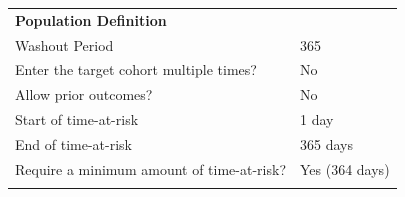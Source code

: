 \documentclass[
]{article}
\begin{document}
\begin{longtable}[]{@{}ll@{}}
\begin{minipage}[t]{0.42\columnwidth}\raggedright
\textbf{Population Definition}\strut
\end{minipage} & \begin{minipage}[t]{0.52\columnwidth}\raggedright
\strut
\end{minipage}\tabularnewline
\begin{minipage}[t]{0.42\columnwidth}\raggedright
Washout Period\strut
\end{minipage} & \begin{minipage}[t]{0.52\columnwidth}\raggedright
365\strut
\end{minipage}\tabularnewline
\begin{minipage}[t]{0.42\columnwidth}\raggedright
Enter the target cohort multiple times?\strut
\end{minipage} & \begin{minipage}[t]{0.52\columnwidth}\raggedright
No\strut
\end{minipage}\tabularnewline
\begin{minipage}[t]{0.42\columnwidth}\raggedright
Allow prior outcomes?\strut
\end{minipage} & \begin{minipage}[t]{0.52\columnwidth}\raggedright
No\strut
\end{minipage}\tabularnewline
\begin{minipage}[t]{0.42\columnwidth}\raggedright
Start of time-at-risk\strut
\end{minipage} & \begin{minipage}[t]{0.52\columnwidth}\raggedright
1 day\strut
\end{minipage}\tabularnewline
\begin{minipage}[t]{0.42\columnwidth}\raggedright
End of time-at-risk\strut
\end{minipage} & \begin{minipage}[t]{0.52\columnwidth}\raggedright
365 days\strut
\end{minipage}\tabularnewline
\begin{minipage}[t]{0.42\columnwidth}\raggedright
Require a minimum amount of time-at-risk?\strut
\end{minipage} & \begin{minipage}[t]{0.52\columnwidth}\raggedright
Yes (364 days)\strut
\end{minipage}\tabularnewline
\begin{minipage}[t]{0.42\columnwidth}\raggedright
\strut
\end{minipage} & \begin{minipage}[t]{0.52\columnwidth}\raggedright

\end{minipage}
\end{longtable}
\end{document}
